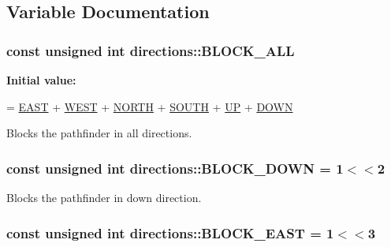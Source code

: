 \subsection{Variable Documentation}
\hypertarget{namespacedirections_a3a3b00ffd9ec88e2780368bd7604e31b}{
\subsubsection[{B\-L\-O\-C\-K\-\_\-\-A\-L\-L}]{\setlength{\rightskip}{0pt plus 5cm}const unsigned int directions\-::\-B\-L\-O\-C\-K\-\_\-\-A\-L\-L}}\label{namespacedirections_a3a3b00ffd9ec88e2780368bd7604e31b}
{\bfseries Initial value\-:}
\begin{DoxyCode}
= \hyperlink{namespacedirections_aaac74a9680a4a4485ea7966d9cc1e7a0}{EAST} + \hyperlink{namespacedirections_a6050c968985dc0ca37f492dbd9665b59}{WEST} + \hyperlink{namespacedirections_abe28a39304326df4cd876a6f8267b8a0}{NORTH} 
        + \hyperlink{namespacedirections_a01f808fbd532b480f6df835ba039eeb3}{SOUTH} + \hyperlink{namespacedirections_a9164128a01e52cb46cea45b60d3e0d24}{UP} + \hyperlink{namespacedirections_ac5b0521b6f55c6c27dd493c816eaf61a}{DOWN}
\end{DoxyCode}
Blocks the pathfinder in all directions. \hypertarget{namespacedirections_aee5c7106d29fd47f5dedb475537fa6ad}{
\subsubsection[{B\-L\-O\-C\-K\-\_\-\-D\-O\-W\-N}]{\setlength{\rightskip}{0pt plus 5cm}const unsigned int directions\-::\-B\-L\-O\-C\-K\-\_\-\-D\-O\-W\-N = 1$<$$<$2}}\label{namespacedirections_aee5c7106d29fd47f5dedb475537fa6ad}
Blocks the pathfinder in down direction. \hypertarget{namespacedirections_aeafc68d54c090e0e7fc49c20f75f6f71}{
\subsubsection[{B\-L\-O\-C\-K\-\_\-\-E\-A\-S\-T}]{\setlength{\rightskip}{0pt plus 5cm}const unsigned int directions\-::\-B\-L\-O\-C\-K\-\_\-\-E\-A\-S\-T = 1$<$$<$3}}\label{namespacedirections_aeafc68d54c090e0e7fc49c20f75f6f71}
